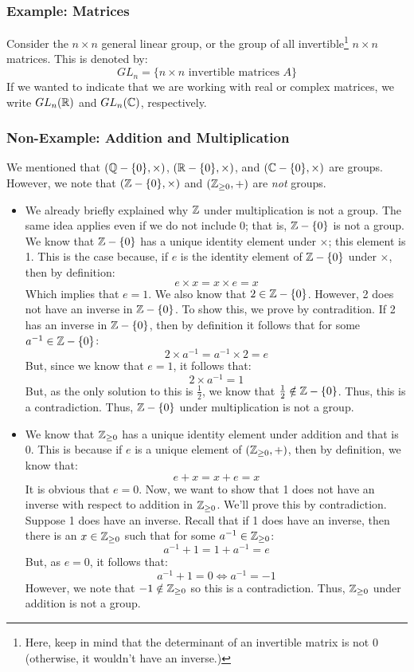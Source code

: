 \documentclass[letterpaper]{article}
\begin{document}
\subsubsection{Example: Matrices}
Consider the $n \times n$ general linear group, or the group of all invertible\footnote{Here, keep in mind that the determinant of an invertible matrix is not 0 (otherwise, it wouldn't have an inverse.)} $n \times n$ matrices. This is denoted by: 
\[GL_n = \{n \times n \text{ invertible matrices } A\}\]
If we wanted to indicate that we are working with real or complex matrices, we write $GL_{n}(\mathbb{R})$ and $GL_{n}(\mathbb{C})$, respectively.

\subsubsection{Non-Example: Addition and Multiplication}
We mentioned that $(\mathbb{Q} - \{0\}, \times)$, $(\mathbb{R} - \{0\}, \times)$, and $(\mathbb{C} - \{0\}, \times)$ are groups. However, we note that $(\mathbb{Z} - \{0\}, \times)$ and $(\mathbb{Z}_{\geq 0}, +)$ are \emph{not} groups. 
\begin{itemize}
    \item We already briefly explained why $\mathbb{Z}$ under multiplication is not a group. The same idea applies even if we do not include 0; that is, $\mathbb{Z} - \{0\}$ is not a group. We know that $\mathbb{Z} - \{0\}$ has a unique identity element under $\times$; this element is 1. This is the case because, if $e$ is the identity element of $\mathbb{Z} - \{0\}$ under $\times$, then by definition: 
    \[e \times x = x \times e = x\]
    Which implies that $e = 1$. We also know that $2 \in \mathbb{Z} - \{0\}$. However, 2 does not have an inverse in $\mathbb{Z} - \{0\}$. To show this, we prove by contradition. If 2 has an inverse in $\mathbb{Z} - \{0\}$, then by definition it follows that for some $a^{-1} \in \mathbb{Z} - \{0\}$:
    \[2 \times a^{-1} = a^{-1} \times 2 = e\]
    But, since we know that $e = 1$, it follows that:
    \[2 \times a^{-1}= 1\]
    But, as the only solution to this is $\frac{1}{2}$, we know that $\frac{1}{2} \notin \mathbb{Z} - \{0\}$. Thus, this is a contradiction. Thus, $\mathbb{Z} - \{0\}$ under multiplication is not a group. 

    \item We know that $\mathbb{Z}_{\geq 0}$ has a unique identity element under addition and that is 0. This is because if $e$ is a unique element of $(\mathbb{Z}_{\geq 0}, +)$, then by definition, we know that: 
    \[e + x = x + e = x\]
    It is obvious that $e = 0$. Now, we want to show that 1 does not have an inverse with respect to addition in $\mathbb{Z}_{\geq 0}$. We'll prove this by contradiction. Suppose 1 does have an inverse. Recall that if 1 does have an inverse, then there is an $x \in \mathbb{Z}_{\geq 0}$ such that for some $a^{-1} \in \mathbb{Z}_{\geq 0}$:
    \[a^{-1} + 1 = 1 + a^{-1} = e\]
    But, as $e = 0$, it follows that: 
    \[a^{-1} + 1 = 0 \iff a^{-1} = -1\]
    However, we note that $-1 \notin \mathbb{Z}_{\geq 0}$ so this is a contradiction. Thus, $\mathbb{Z}_{\geq 0}$ under addition is not a group.
\end{itemize}
\end{document}
